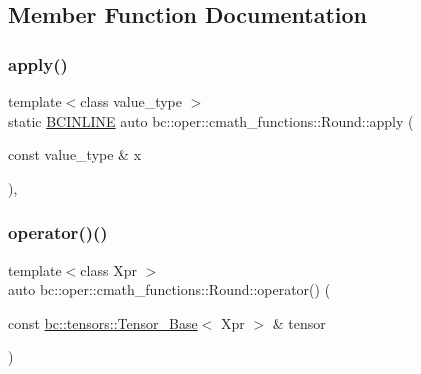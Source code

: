 \subsection{Member Function Documentation}
\mbox{\label{structbc_1_1oper_1_1cmath__functions_1_1Round_af83dcc8329027e7abc9a831696527687}} 
\subsubsection{\texorpdfstring{apply()}{apply()}}
{\footnotesize\ttfamily template$<$class value\+\_\+type $>$ \\
static \hyperlink{common_8h_a6699e8b0449da5c0fafb878e59c1d4b1}{B\+C\+I\+N\+L\+I\+NE} auto bc\+::oper\+::cmath\+\_\+functions\+::\+Round\+::apply (\begin{DoxyParamCaption}\item[{const value\+\_\+type \&}]{x }\end{DoxyParamCaption})\hspace{0.3cm}{\ttfamily [inline]}, {\ttfamily [static]}}

\mbox{\label{structbc_1_1oper_1_1cmath__functions_1_1Round_ae204a8cef526adfe4872c7f2a69e039d}} 
\subsubsection{\texorpdfstring{operator()()}{operator()()}\hspace{0.1cm}{\footnotesize\ttfamily [1/3]}}
{\footnotesize\ttfamily template$<$class Xpr $>$ \\
auto bc\+::oper\+::cmath\+\_\+functions\+::\+Round\+::operator() (\begin{DoxyParamCaption}\item[{const \hyperlink{classbc_1_1tensors_1_1Tensor__Base}{bc\+::tensors\+::\+Tensor\+\_\+\+Base}$<$ Xpr $>$ \&}]{tensor }\end{DoxyParamCaption})\hspace{0.3cm}{\ttfamily [inline]}}

